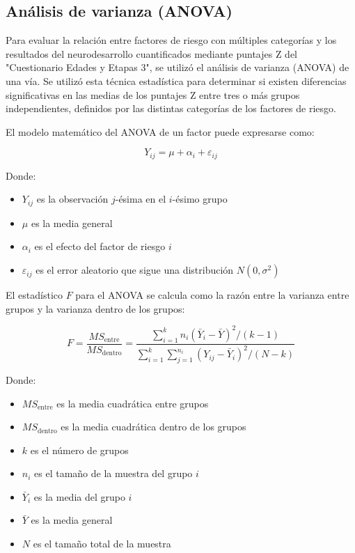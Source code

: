 \documentclass[11pt,letterpaper]{report}
\newcommand{\asq}{"Cuestionario Edades y Etapas 3"}
\begin{document}
\subsection{Análisis de varianza (ANOVA)}
Para evaluar la relación entre factores de riesgo con múltiples categorías y
los resultados del neurodesarrollo cuantificados mediante puntajes Z del 
\asq, se utilizó el análisis de varianza (ANOVA) de una vía. Se utilizó esta
técnica estadística para determinar si existen diferencias significativas en las
medias de los puntajes Z entre tres o más grupos independientes, definidos por
las distintas categorías de los factores de riesgo.

El modelo matemático del ANOVA de un factor puede expresarse como:

\begin{equation}
Y_{ij} = \mu + \alpha_i + \varepsilon_{ij}
\end{equation}

Donde:
\begin{itemize}
    \item $Y_{ij}$ es la observación $j$-ésima en el $i$-ésimo grupo
    \item $\mu$ es la media general
    \item $\alpha_i$ es el efecto del factor de riesgo $i$
    \item $\varepsilon_{ij}$ es el error aleatorio que sigue una distribución $N(0, \sigma^2)$
\end{itemize}

El estadístico $F$ para el ANOVA se calcula como la razón entre la varianza
entre grupos y la varianza dentro de los grupos:

\begin{equation}
F = \frac{MS_{\text{entre}}}{MS_{\text{dentro}}} = \frac{\sum_{i=1}^{k} n_i(\bar{Y}_i - \bar{Y})^2/(k-1)}{\sum_{i=1}^{k}\sum_{j=1}^{n_i} (Y_{ij} - \bar{Y}_i)^2/(N-k)}
\end{equation}

Donde:
\begin{itemize}
    \item $MS_{\text{entre}}$ es la media cuadrática entre grupos
    \item $MS_{\text{dentro}}$ es la media cuadrática dentro de los grupos
    \item $k$ es el número de grupos
    \item $n_i$ es el tamaño de la muestra del grupo $i$
    \item $\bar{Y}_i$ es la media del grupo $i$
    \item $\bar{Y}$ es la media general
    \item $N$ es el tamaño total de la muestra
\end{itemize}
\end{document}
